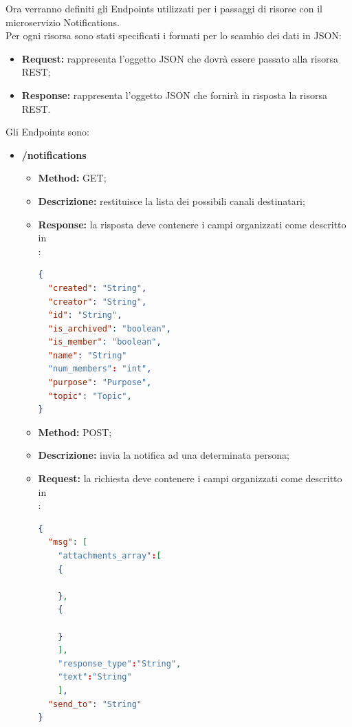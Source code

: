 Ora verranno definiti gli Endpoints utilizzati per i passaggi di risorse con il microservizio Notifications. \\
Per ogni risorsa sono stati specificati i formati per lo scambio dei dati in JSON: 
\begin{itemize}
\item \textbf{Request:} rappresenta l’oggetto JSON che dovrà essere passato alla risorsa REST;
\item \textbf{Response:} rappresenta l’oggetto JSON che fornirà in risposta la risorsa REST.
\end{itemize}
Gli Endpoints sono: 
\begin{itemize}

\item \textbf{/notifications}\\
\begin{itemize}
\item \textbf{Method:} GET;
\item \textbf{Descrizione:} restituisce la lista dei possibili canali destinatari;
\item \textbf{Response:} la risposta deve contenere i campi organizzati come descritto in \\:
\begin{lstlisting}[language=json,firstnumber=1]
{
  "created": "String",
  "creator": "String",
  "id": "String",
  "is_archived": "boolean",
  "is_member": "boolean",
  "name": "String"
  "num_members": "int",
  "purpose": "Purpose",
  "topic": "Topic",
}
\end{lstlisting}
\end{itemize}

\begin{itemize}
\item \textbf{Method:} POST;
\item \textbf{Descrizione:} invia la notifica ad una determinata persona;
\item \textbf{Request:} la richiesta deve contenere i campi organizzati come descritto in \\:
\begin{lstlisting}[language=json,firstnumber=1]
{
  "msg": [
	"attachments_array":[
	{
				
	},
	{
			
	}
	],
	"response_type":"String",
	"text":"String"
	],
  "send_to": "String"
}
\end{lstlisting}
\end{itemize}
\end{itemize}

